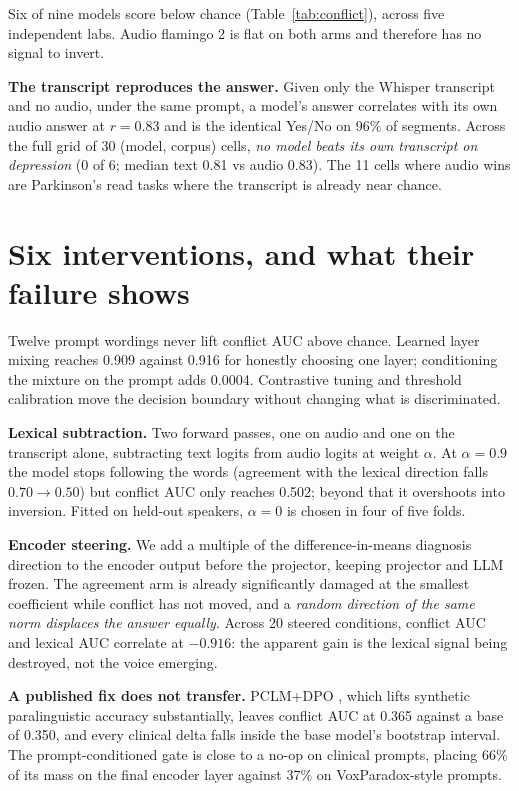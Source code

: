 \documentclass{article}
\begin{document}
Six of nine models score below chance (Table~\ref{tab:conflict}), across five independent
labs. Audio flamingo 2 is flat on both arms and therefore has no signal to invert.

\noindent\textbf{The transcript reproduces the answer.} Given only the Whisper transcript and
no audio, under the same prompt, a model's answer correlates with its own audio answer at
$r=0.83$ and is the identical Yes/No on 96\% of segments. Across the full grid of 30
(model, corpus) cells, \emph{no model beats its own transcript on depression} (0 of 6; median
text 0.81 vs audio 0.83). The 11 cells where audio wins are Parkinson's read tasks where the
transcript is already near chance.

\section{Six interventions, and what their failure shows}\label{sec:interventions}

Twelve prompt wordings never lift conflict AUC above chance. Learned layer mixing reaches 0.909
against 0.916 for honestly choosing one layer; conditioning the mixture on the prompt adds
0.0004. Contrastive tuning and threshold calibration move the decision boundary without
changing what is discriminated.

\noindent\textbf{Lexical subtraction.} Two forward passes, one on audio and one on the
transcript alone, subtracting text logits from audio logits at weight $\alpha$. At
$\alpha=0.9$ the model stops following the words (agreement with the lexical direction falls
$0.70\rightarrow0.50$) but conflict AUC only reaches 0.502; beyond that it overshoots into
inversion. Fitted on held-out speakers, $\alpha=0$ is chosen in four of five folds.

\noindent\textbf{Encoder steering.} We add a multiple of the difference-in-means diagnosis
direction to the encoder output before the projector, keeping projector and LLM frozen. The
agreement arm is already significantly damaged at the smallest coefficient while conflict has
not moved, and a \emph{random direction of the same norm displaces the answer equally}. Across
20 steered conditions, conflict AUC and lexical AUC correlate at $-0.916$: the apparent gain is
the lexical signal being destroyed, not the voice emerging.

\noindent\textbf{A published fix does not transfer.} PCLM+DPO \cite{voxparadox2026}, which
lifts synthetic paralinguistic accuracy substantially, leaves conflict AUC at 0.365 against a
base of 0.350, and every clinical delta falls inside the base model's bootstrap interval. The
prompt-conditioned gate is close to a no-op on clinical prompts, placing 66\% of its mass on
the final encoder layer against 37\% on VoxParadox-style prompts.
\end{document}
